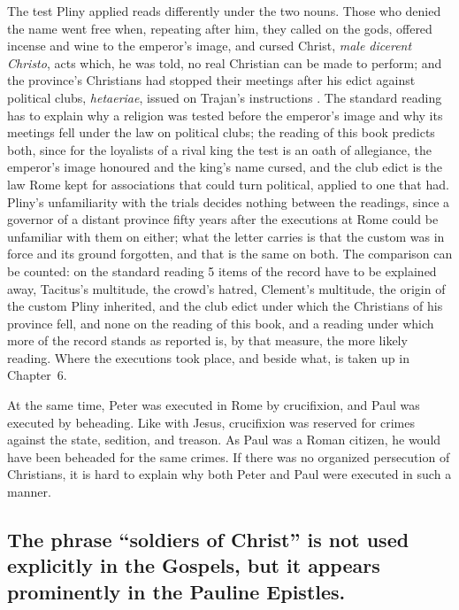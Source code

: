 The test Pliny applied reads differently under the two nouns.
Those who denied the name went free when, repeating after him, they called on the gods, offered incense and wine to the emperor's image, and cursed Christ, \emph{male dicerent Christo}, acts which, he was told, no real Christian can be made to perform; and the province's Christians had stopped their meetings after his edict against political clubs, \emph{hetaeriae}, issued on Trajan's instructions \cite[10.96]{pliny:letters}.
The standard reading has to explain why a religion was tested before the emperor's image and why its meetings fell under the law on political clubs; the reading of this book predicts both, since for the loyalists of a rival king the test is an oath of allegiance, the emperor's image honoured and the king's name cursed, and the club edict is the law Rome kept for associations that could turn political, applied to one that had.
Pliny's unfamiliarity with the trials decides nothing between the readings, since a governor of a distant province fifty years after the executions at Rome could be unfamiliar with them on either; what the letter carries is that the custom was in force and its ground forgotten, and that is the same on both.
The comparison can be counted: on the standard reading 5 items of the record have to be explained away, Tacitus's multitude, the crowd's hatred, Clement's multitude, the origin of the custom Pliny inherited, and the club edict under which the Christians of his province fell, and none on the reading of this book, and a reading under which more of the record stands as reported is, by that measure, the more likely reading.
Where the executions took place, and beside what, is taken up in Chapter~6.

At the same time, Peter was executed in Rome by crucifixion, and Paul was executed by beheading.
Like with Jesus, crucifixion was reserved for crimes against the state, sedition, and treason.
As Paul was a Roman citizen, he would have been beheaded for the same crimes.
If there was no organized persecution of Christians, it is hard to explain why both Peter and Paul were executed in such a manner.

\subsection{The phrase ``soldiers of Christ'' is not used explicitly in the Gospels, but it appears prominently in the Pauline Epistles.}\label{subsec:the-phrase-soldiers-of-christ-is-not-used-explicitly-in-the-gospels-but-it-appears-prominently-in-the-pauline-epistles-particularly-in-the-context-of-the-christian-life-being-compared-to-a-military-struggle-or-a-spiritual-battle.}

